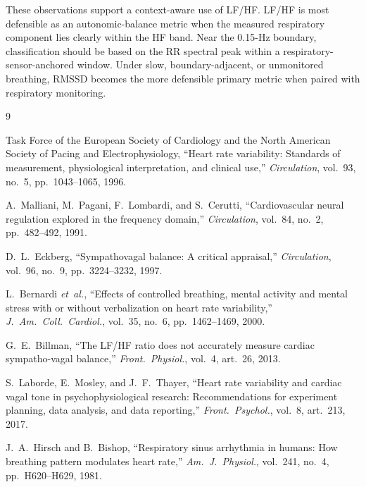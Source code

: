 \documentclass[11pt,a4paper]{article}
\begin{document}
These observations support a context-aware use of LF/HF. LF/HF is most
defensible as an autonomic-balance metric when the measured respiratory
component lies clearly within the HF band. Near the 0.15-Hz boundary,
classification should be based on the RR spectral peak within a
respiratory-sensor-anchored window. Under slow, boundary-adjacent, or
unmonitored breathing, RMSSD becomes the more defensible primary metric when
paired with respiratory monitoring.

\begin{thebibliography}{9}

Task Force of the European Society of Cardiology and the North American
Society of Pacing and Electrophysiology,
``Heart rate variability: Standards of measurement, physiological
interpretation, and clinical use,''
\emph{Circulation}, vol.~93, no.~5, pp.~1043--1065, 1996.

A.~Malliani, M.~Pagani, F.~Lombardi, and S.~Cerutti,
``Cardiovascular neural regulation explored in the frequency domain,''
\emph{Circulation}, vol.~84, no.~2, pp.~482--492, 1991.

D.~L.~Eckberg,
``Sympathovagal balance: A critical appraisal,''
\emph{Circulation}, vol.~96, no.~9, pp.~3224--3232, 1997.

L.~Bernardi \emph{et~al.},
``Effects of controlled breathing, mental activity and mental stress with
or without verbalization on heart rate variability,''
\emph{J.\ Am.\ Coll.\ Cardiol.}, vol.~35, no.~6, pp.~1462--1469, 2000.

G.~E.~Billman,
``The LF/HF ratio does not accurately measure cardiac sympatho-vagal
balance,''
\emph{Front.\ Physiol.}, vol.~4, art.~26, 2013.

S.~Laborde, E.~Mosley, and J.~F.~Thayer,
``Heart rate variability and cardiac vagal tone in psychophysiological
research: Recommendations for experiment planning, data analysis, and
data reporting,''
\emph{Front.\ Psychol.}, vol.~8, art.~213, 2017.

J.~A.~Hirsch and B.~Bishop,
``Respiratory sinus arrhythmia in humans: How breathing pattern modulates
heart rate,''
\emph{Am.\ J.\ Physiol.}, vol.~241, no.~4, pp.~H620--H629, 1981.
\end{thebibliography}
\end{document}
